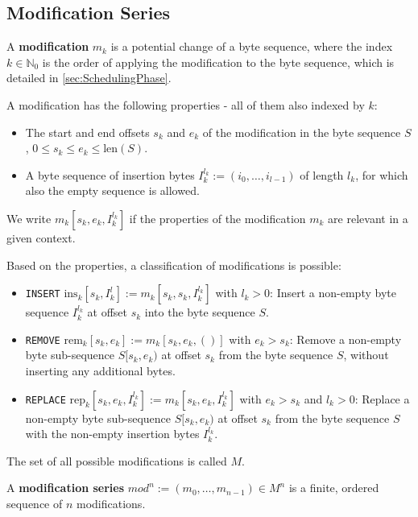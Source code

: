 \documentclass[english, 10pt, openright, twocolumn, landscape, twoside, notitlepage, a4paper, pdftex]		
{article}
\begin{document}
\subsection{Modification Series}%
\label{sec:ModificationSeries}%

A \textbf{modification} $m_{k}$ is a potential change of a byte sequence, where the index $k\in\mathbb{N}_{0}$ is the order of applying the modification to the byte sequence, which is detailed in \ref{sec:SchedulingPhase}.

A modification has the following properties - all of them also indexed by $k$:
\begin{itemize}
\item The start and end offsets $s_{k}$ and $e_{k}$ of the modification in the byte sequence $S$, $0\leq s_{k}\leq e_{k}\leq \text{len}(S)$.
\item A byte sequence of insertion bytes $I_{k}^{l_{k}}:=(i_{0},\ldots,i_{l-1})$ of length $l_{k}$, for which also the empty sequence is allowed.
\end{itemize}

We write $m_{k}[s_{k}, e_{k}, I_{k}^{l_{k}}]$ if the properties of the modification $m_{k}$ are relevant in a given context.

Based on the properties, a classification of modifications is possible:
\begin{itemize}
\item \texttt{INSERT} $\text{ins}_{k}[s_{k},I_{k}^{l}]:=m_{k}[s_{k},s_{k},I_{k}^{l_{k}}]$ with $l_{k}>0$: Insert a non-empty byte sequence $I_{k}^{l_{k}}$ at offset $s_{k}$ into the byte sequence $S$.
\item \texttt{REMOVE} $\text{rem}_{k}[s_{k},e_{k}]:=m_{k}[s_{k},e_{k},()]$ with $e_{k}>s_{k}$: Remove a non-empty byte sub-sequence $S[s_{k},e_{k})$ at offset $s_{k}$ from the byte sequence $S$, without inserting any additional bytes.
\item \texttt{REPLACE} $\text{rep}_{k}[s_{k},e_{k},I_{k}^{l_{k}}]:=m_{k}[s_{k},e_{k},I_{k}^{l_{k}}]$ with $e_{k}>s_{k}$ and $l_{k}>0$: Replace a non-empty byte sub-sequence $S[s_{k},e_{k})$ at offset $s_{k}$ from the byte sequence $S$ with the non-empty insertion bytes $I_{k}^{l_{k}}$.
\end{itemize}

The set of all possible modifications is called $M$.

A \textbf{modification series} $mod^{n} :=(m_{0},\ldots,m_{n-1})\in M^{n}$ is a finite, ordered sequence of $n$ modifications.
\end{document}

